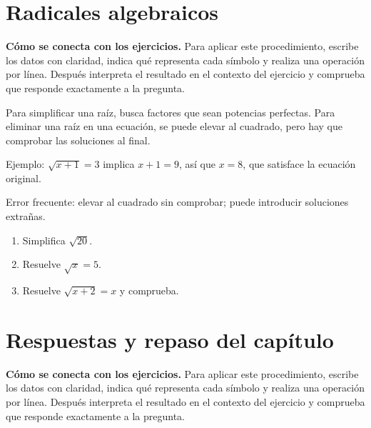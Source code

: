 \documentclass[10pt,oneside,openany]{book}
\begin{document}
\section{Radicales algebraicos}

\textbf{Cómo se conecta con los ejercicios.} Para aplicar este procedimiento, escribe los datos con claridad, indica qué representa cada símbolo y realiza una operación por línea. Después interpreta el resultado en el contexto del ejercicio y comprueba que responde exactamente a la pregunta.

Para simplificar una raíz, busca factores que sean potencias perfectas. Para eliminar una raíz en una ecuación, se puede elevar al cuadrado, pero hay que comprobar las soluciones al final.

\begin{ejemplo}
Ejemplo: $\sqrt{x+1}=3$ implica $x+1=9$, así que $x=8$, que satisface la ecuación original.
\end{ejemplo}

\begin{ojo}
Error frecuente: elevar al cuadrado sin comprobar; puede introducir soluciones extrañas.
\end{ojo}

\begin{practica}

\begin{enumerate}

\item Simplifica $\sqrt{20}$.

\item Resuelve $\sqrt{x}=5$.

\item Resuelve $\sqrt{x+2}=x$ y comprueba.

\end{enumerate}

\end{practica}



\section{Respuestas y repaso del capítulo}

\textbf{Cómo se conecta con los ejercicios.} Para aplicar este procedimiento, escribe los datos con claridad, indica qué representa cada símbolo y realiza una operación por línea. Después interpreta el resultado en el contexto del ejercicio y comprueba que responde exactamente a la pregunta.
\end{document}
